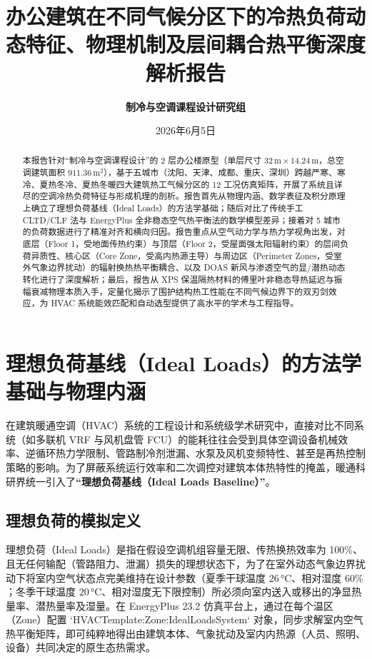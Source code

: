 \documentclass[11pt,a4paper]{article}
\title{\textbf{办公建筑在不同气候分区下的冷热负荷动态特征、物理机制及层间耦合热平衡深度解析报告}}
\author{\textbf{制冷与空调课程设计研究组}}
\date{2026年6月5日}
\begin{document}
\maketitle

\begin{abstract}
    本报告针对“制冷与空调课程设计”的 2 层办公楼原型（单层尺寸 $32\,\mathrm{m} \times 14.24\,\mathrm{m}$，总空调建筑面积 $911.36\,\mathrm{m^2}$），基于五城市（沈阳、天津、成都、重庆、深圳）跨越严寒、寒冷、夏热冬冷、夏热冬暖四大建筑热工气候分区的 12 工况仿真矩阵，开展了系统且详尽的空调冷热负荷特征与形成机理的剖析。报告首先从物理内涵、数学表征及积分原理上确立了理想负荷基线（Ideal Loads）的方法学基础；随后对比了传统手工 CLTD/CLF 法与 EnergyPlus 全非稳态空气热平衡法的数学模型差异；接着对 5 城市的负荷数据进行了精准对齐和横向归因。报告重点从空气动力学与热力学视角出发，对底层（Floor 1，受地面传热约束）与顶层（Floor 2，受屋面强太阳辐射约束）的层间负荷异质性、核心区（Core Zone，受高内热源主导）与周边区（Perimeter Zones，受室外气象边界扰动）的辐射换热热平衡耦合、以及 DOAS 新风与渗透空气的显/潜热动态转化进行了深度解析；最后，报告从 XPS 保温隔热材料的傅里叶非稳态导热延迟与振幅衰减物理本质入手，定量化揭示了围护结构热工性能在不同气候边界下的双刃剑效应，为 HVAC 系统能效匹配和自动选型提供了高水平的学术与工程指导。
\end{abstract}

\tableofcontents
\newpage

\section{理想负荷基线（Ideal Loads）的方法学基础与物理内涵}

在建筑暖通空调（HVAC）系统的工程设计和系统级学术研究中，直接对比不同系统（如多联机 VRF 与风机盘管 FCU）的能耗往往会受到具体空调设备机械效率、逆循环热力学限制、管路制冷剂泄漏、水泵及风机变频特性、甚至是再热控制策略的影响。为了屏蔽系统运行效率和二次调控对建筑本体热特性的掩盖，暖通科研界统一引入了\textbf{“理想负荷基线（Ideal Loads Baseline）”}。

\subsection{理想负荷的模拟定义}
理想负荷（Ideal Loads）是指在假设空调机组容量无限、传热换热效率为 100\%、且无任何输配（管路阻力、泄漏）损失的理想状态下，为了在室外动态气象边界扰动下将室内空气状态点完美维持在设计参数（夏季干球温度 $26\,\si{\degreeCelsius}$、相对湿度 $60\%$；冬季干球温度 $20\,\si{\degreeCelsius}$、相对湿度无下限控制）所必须向室内送入或移出的净显热量率、潜热量率及湿量。在 EnergyPlus 23.2 仿真平台上，通过在每个温区（Zone）配置 `HVACTemplate:Zone:IdealLoadsSystem` 对象，同步求解室内空气热平衡矩阵，即可纯粹地得出由建筑本体、气象扰动及室内内热源（人员、照明、设备）共同决定的原生态热需求。
\end{document}
